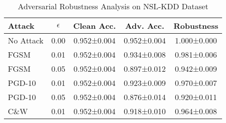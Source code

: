 \begin{table}[t]
\centering
\caption{Adversarial Robustness Analysis on NSL-KDD Dataset}
\label{tab:adversarial}
\begin{tabular}{@{}lcccc@{}}
\toprule
\textbf{Attack} & \textbf{$\epsilon$} & \textbf{Clean Acc.} & \textbf{Adv. Acc.} & \textbf{Robustness} \\
\midrule
No Attack & 0.00 & 0.952±0.004 & 0.952±0.004 & 1.000±0.000 \\
FGSM & 0.01 & 0.952±0.004 & 0.934±0.008 & 0.981±0.006 \\
FGSM & 0.05 & 0.952±0.004 & 0.897±0.012 & 0.942±0.009 \\
PGD-10 & 0.01 & 0.952±0.004 & 0.923±0.009 & 0.970±0.007 \\
PGD-10 & 0.05 & 0.952±0.004 & 0.876±0.014 & 0.920±0.011 \\
C\&W & 0.01 & 0.952±0.004 & 0.918±0.010 & 0.964±0.008 \\
\bottomrule
\end{tabular}
\end{table}
